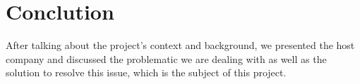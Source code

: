 \section{Conclution}
  After talking about the project's context and background, we presented the host company and discussed the
  problematic we are dealing with as well as the solution to resolve this issue, which is the subject of this
  project.

\clearpage